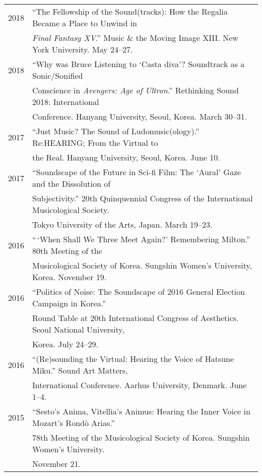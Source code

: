 \documentclass[letter,11pt]{article}
\begin{document}
  \hspace*{-0.25cm}
  \begin{tabular}{p{2.5cm} p{12.5cm}}
  2018 & ``The Fellowship of the Sound(tracks): How the Regalia Became a Place to Unwind in\\
  & \textit{Final Fantasy XV}.'' Music \& the Moving Image XIII. New York University. May 24--27.\\[2mm]
  
  2018 & ``Why was Bruce Listening to `Casta diva'? Soundtrack as a Sonic/Sonified\\
  & Conscience in \textit{Avengers: Age of Ultron}.'' Rethinking Sound 2018: International\\
  & Conference. Hanyang University, Seoul, Korea. March 30--31.\\[2mm]
  
  2017 & ``Just Music? The Sound of Ludomusic(ology).'' Re:HEARING; From the Virtual to\\
  & the Real. Hanyang University, Seoul, Korea. June 10.\\[2mm]
  
  2017 & ``Soundscape of the Future in Sci-fi Film: The ‘Aural’ Gaze and the Dissolution of\\
  & Subjectivity.'' 20th Quinquennial Congress of the International Musicological Society.\\
  & Tokyo University of the Arts, Japan. March 19--23.\\[2mm]
  
  2016 & ``\,`When Shall We Three Meet Again?' Remembering Milton.'' 80th Meeting of the\\
  & Musicological Society of Korea. Sungshin Women's University, Korea. November 19.\\[2mm]
  
  2016 & ``Politics of Noise: The Soundscape of 2016 General Election Campaign in Korea.''\\
  & Round Table at 20th International Congress of Aesthetics. Seoul National University,\\
  & Korea. July 24--29.\\[2mm]
  
  2016 & ``(Re)sounding the Virtual: Hearing the Voice of Hatsune Miku.'' Sound Art Matters,\\
  & International Conference. Aarhus University, Denmark. June 1--4.\\[2mm]
  
  2015 & ``Sesto's Anima, Vitellia's Animus: Hearing the Inner Voice in Mozart’s Rond\`{o} Arias.''\\
  & 78th Meeting of the Musicological Society of Korea. Sungshin Women's University.\\
  & November 21.\\[2mm]


\end{tabular}
\end{document}
